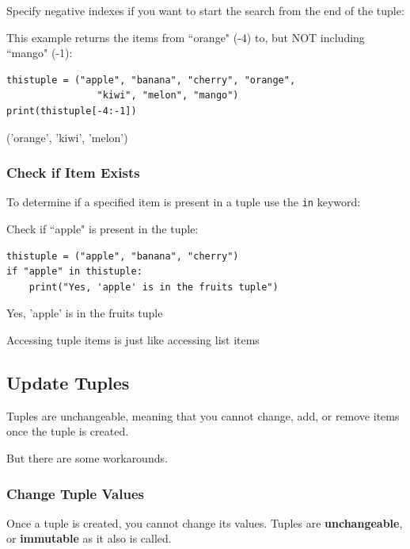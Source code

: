 \documentclass[12pt,a4paper]{article}
\newcommand{\code}[1]{%
	\colorbox{backcolour}{\lstinline{#1}}%
}
\begin{document}
Specify negative indexes if you want to start the search from
the end of the tuple:

\begin{ebox}
This example returns the items from ``orange" (-4) to, but NOT including ``mango" (-1):
	\begin{lstlisting}
thistuple = ("apple", "banana", "cherry", "orange",
                "kiwi", "melon", "mango")
print(thistuple[-4:-1])
	\end{lstlisting}
\tcblower
	\begin{vercode}
('orange', 'kiwi', 'melon')
	\end{vercode}
\end{ebox}
\subsubsection{Check if Item Exists}

To determine if a specified item is present in a tuple use the \code{in} keyword:

\begin{ebox}
Check if ``apple" is present in the tuple:
	\begin{lstlisting}
thistuple = ("apple", "banana", "cherry")
if "apple" in thistuple:
    print("Yes, 'apple' is in the fruits tuple")
	\end{lstlisting}
\tcblower
	\begin{vercode}
Yes, 'apple' is in the fruits tuple
	\end{vercode}
\end{ebox}
\begin{nbox}
	Accessing tuple items is just like accessing list items
\end{nbox}
\subsection{Update Tuples}

Tuples are unchangeable, meaning that you cannot change, add, or remove items
once the tuple is created.

But there are some workarounds.

\subsubsection{Change Tuple Values}

Once a tuple is created, you cannot change its values. Tuples are
\textbf{unchangeable}, or \textbf{immutable} as it also is called.
\end{document}
